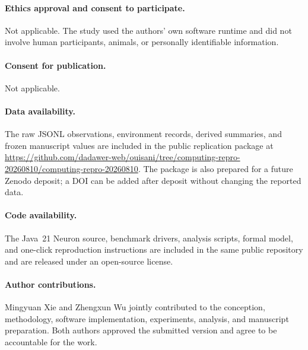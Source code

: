 \paragraph{Ethics approval and consent to participate.}
Not applicable. The study used the authors' own software runtime and did not
involve human participants, animals, or personally identifiable information.

\paragraph{Consent for publication.}
Not applicable.

\paragraph{Data availability.}
The raw JSONL observations, environment records, derived summaries, and
frozen manuscript values are included in the public replication package at
\url{https://github.com/dadawer-web/ouisani/tree/computing-repro-20260810/computing-repro-20260810}.
The package is also prepared for a future Zenodo deposit; a DOI can be added
after deposit without changing the reported data.

\paragraph{Code availability.}
The Java~21 Neuron source, benchmark drivers, analysis scripts, formal model,
and one-click reproduction instructions are included in the same public
repository and are released under an open-source license.

\paragraph{Author contributions.}
Mingyuan Xie and Zhengxun Wu jointly contributed to the conception,
methodology, software implementation, experiments, analysis, and manuscript
preparation. Both authors approved the submitted version and agree to be
accountable for the work.
